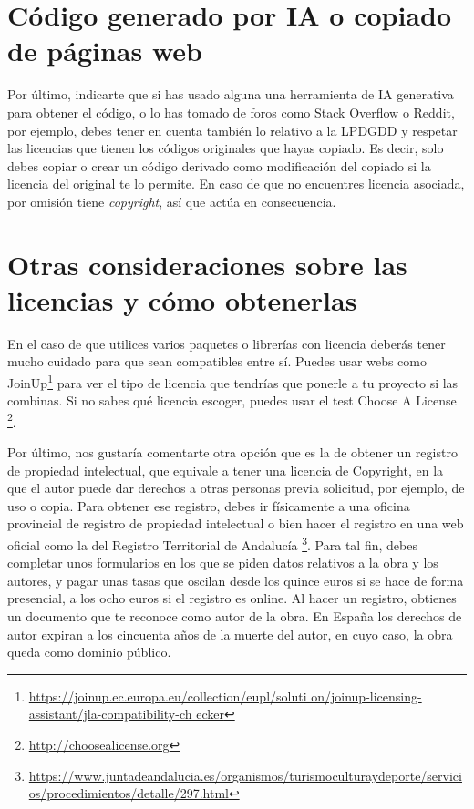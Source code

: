 \section{Código generado por IA o copiado de páginas web}

Por último, indicarte que si has usado alguna una herramienta de IA generativa para obtener el código, o lo has tomado de foros como Stack Overflow o Reddit, por ejemplo, debes tener en cuenta también lo relativo a la LPDGDD y respetar las licencias que tienen los códigos originales que hayas copiado. Es decir, solo debes copiar o crear un código derivado como modificación del copiado si la licencia del original te lo permite. En caso de que no encuentres licencia asociada, por omisión tiene \textit{copyright}, así que actúa en consecuencia.


\section{Otras consideraciones sobre las licencias y cómo obtenerlas}

En el caso de que utilices varios paquetes o librerías con licencia deberás tener mucho cuidado para que sean compatibles entre sí. Puedes usar webs como JoinUp\footnote{\url{https://joinup.ec.europa.eu/collection/eupl/soluti on/joinup-licensing-assistant/jla-compatibility-ch ecker}} para ver el tipo de licencia que tendrías que ponerle a tu proyecto si las combinas. Si no sabes qué licencia escoger, puedes usar el test Choose A License \footnote{\url{http://choosealicense.org}}.

Por último, nos gustaría comentarte otra opción que es la de obtener un registro de propiedad intelectual, que equivale a tener una licencia de Copyright, en la que el autor puede dar derechos a otras personas previa solicitud, por ejemplo, de uso o copia. Para obtener ese registro, debes ir físicamente a una oficina provincial de registro de propiedad intelectual o bien hacer el registro en una web oficial como la del Registro Territorial de Andalucía \footnote{\url{https://www.juntadeandalucia.es/organismos/turismoculturaydeporte/servicios/procedimientos/detalle/297.html}}. Para tal fin, debes completar unos formularios en los que se piden datos relativos a la obra y los autores, y pagar unas tasas que oscilan desde los quince euros si se hace de forma presencial, a los ocho euros si el registro es online. Al hacer un registro, obtienes un documento que te reconoce como autor de la obra. En España los derechos de autor expiran a los cincuenta años de la muerte del autor, en cuyo caso, la obra queda como dominio público.

